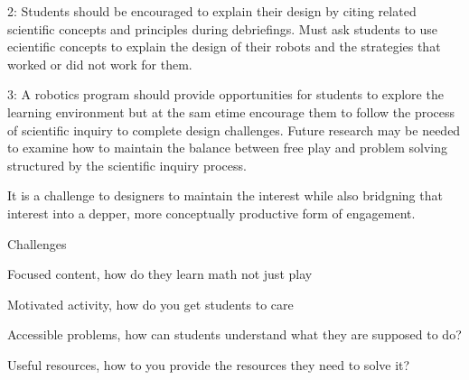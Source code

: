 2: Students should be encouraged to explain their design by citing related scientific concepts and principles during debriefings. Must ask students to use ecientific concepts to explain the design of their robots and the strategies that worked or did not work for them. 

3: A robotics program should provide opportunities for students to explore the learning environment but at the sam etime encourage them to follow the process of scientific inquiry to complete design challenges. Future research may be needed to examine how to maintain the balance between free play and problem solving structured by the scientific inquiry process. 

It is a challenge to designers to maintain the interest while also bridgning that interest into a depper, more conceptually productive form of engagement. 

Challenges

Focused content, how do they learn math not just play

Motivated activity, how do you get students to care

Accessible problems, how can students understand what they are supposed to do?

Useful resources, how to you provide the resources they need to solve it?
